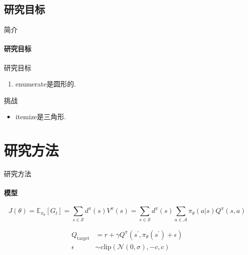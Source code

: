 \documentclass[10pt,aspectratio=169,]{beamer}
\begin{document}
\subsection{研究目标}
\begin{frame}[c]{简介}
	\framesubtitle{研究目标}
	\begin{block}{研究目标}
		\begin{enumerate}
			\item enumerate是圆形的.
		\end{enumerate}
	\end{block}
	
	\begin{alertblock}{挑战}
		\begin{itemize}
            \item itemize是三角形.
        \end{itemize}
	\end{alertblock}
	
\end{frame}	

\section{研究方法}

\begin{frame}{研究方法}
	\framesubtitle{模型}
	\begin{equation*}
		J(\theta) = \mathbb{E}_{\pi_\theta}[G_t] = \sum_{s\in\mathcal{S}} d^\pi (s)V^\pi(s)=\sum_{s\in\mathcal{S}} d^\pi(s)\sum_{a\in\mathcal{A}}\pi_\theta(a|s)Q^\pi(s,a)
	\end{equation*}
	
	\begin{align}
		Q_\mathrm{target}&=r+\gamma Q^\pi(s^\prime, \pi_\theta(s^\prime)+\epsilon)\\
		\epsilon&\sim\mathrm{clip}(\mathcal{N}(0, \sigma), -c, c)\nonumber
	\end{align}
\end{frame}
\end{document}
